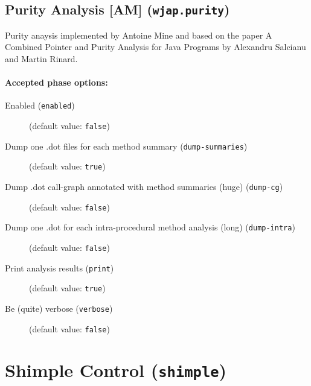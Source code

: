 \documentclass{article}
\begin{document}
\subsection{Purity Analysis [AM] ({\tt wjap.purity})}

Purity anaysis implemented by Antoine Mine and based on the paper
A Combined Pointer and Purity Analysis for Java Programs by 
Alexandru Salcianu and Martin Rinard.
                    

\paragraph{Accepted phase options:} 

\begin{description}

\item[Enabled ({\tt enabled})]
(default value: {\tt false})






\item[Dump one .dot files for each method summary ({\tt dump-summaries})]
(default value: {\tt true})






\item[Dump .dot call-graph annotated with method summaries (huge) ({\tt dump-cg})]
(default value: {\tt false})






\item[Dump one .dot for each intra-procedural method analysis (long) ({\tt dump-intra})]
(default value: {\tt false})






\item[Print analysis results ({\tt print})]
(default value: {\tt true})






\item[Be (quite) verbose ({\tt verbose})]
(default value: {\tt false})






\end{description}

\section{Shimple Control ({\tt shimple})}
\end{document}
